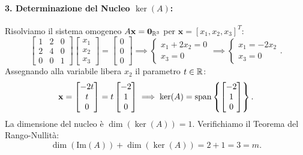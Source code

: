 \begin{example}
\paragraph{3. Determinazione del Nucleo $\ker(A)$:}
Risolviamo il sistema omogeneo $A\mathbf{x} = \mathbf{0}_{\mathbb{R}^3}$ per $\mathbf{x} = [x_1, x_2, x_3]^T$:
\begin{equation}
    \begin{bmatrix} 1 & 2 & 0 \\ 2 & 4 & 0 \\ 0 & 0 & 1 \end{bmatrix} \begin{bmatrix} x_1 \\ x_2 \\ x_3 \end{bmatrix} = \begin{bmatrix} 0 \\ 0 \\ 0 \end{bmatrix} \implies \begin{cases} x_1 + 2x_2 = 0 \\ x_3 = 0 \end{cases} \implies \begin{cases} x_1 = -2x_2 \\ x_3 = 0 \end{cases}.
\end{equation}
Assegnando alla variabile libera $x_2$ il parametro $t \in \mathbb{R}$:
\begin{equation}
    \mathbf{x} = \begin{bmatrix} -2t \\ t \\ 0 \end{bmatrix} = t \begin{bmatrix} -2 \\ 1 \\ 0 \end{bmatrix} \implies \ker(A) = \operatorname{span}\left\{ \begin{bmatrix} -2 \\ 1 \\ 0 \end{bmatrix} \right\}.
\end{equation}
La dimensione del nucleo \`e $\dim(\ker(A)) = 1$. Verifichiamo il Teorema del Rango-Nullit\`a:
\begin{equation}
    \dim(\mathrm{Im}(A)) + \dim(\ker(A)) = 2 + 1 = 3 = m.
\end{equation}
\end{example}

